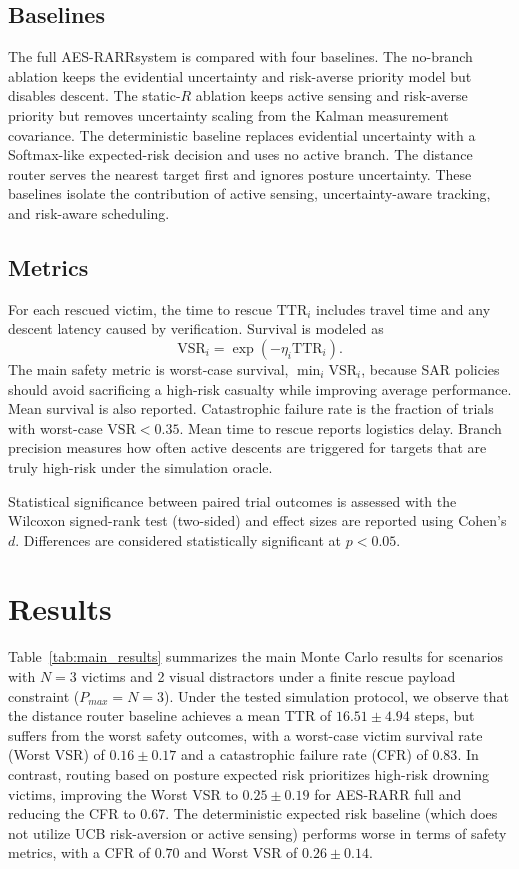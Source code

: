\documentclass[runningheads]{llncs}
\newcommand{\aes}{AES-RARR}
\newcommand{\vsr}{\mathrm{VSR}}
\newcommand{\ttr}{\mathrm{TTR}}
\begin{document}
\subsection{Baselines}

The full \aes system is compared with four baselines. The no-branch ablation keeps the evidential uncertainty and risk-averse priority model but disables descent. The static-$R$ ablation keeps active sensing and risk-averse priority but removes uncertainty scaling from the Kalman measurement covariance. The deterministic baseline replaces evidential uncertainty with a Softmax-like expected-risk decision and uses no active branch. The distance router serves the nearest target first and ignores posture uncertainty. These baselines isolate the contribution of active sensing, uncertainty-aware tracking, and risk-aware scheduling.

\subsection{Metrics}

For each rescued victim, the time to rescue $\ttr_i$ includes travel time and any descent latency caused by verification. Survival is modeled as
\begin{equation}
  \vsr_i=\exp(-\eta_i\ttr_i).
\end{equation}
The main safety metric is worst-case survival, $\min_i \vsr_i$, because SAR policies should avoid sacrificing a high-risk casualty while improving average performance. Mean survival is also reported. Catastrophic failure rate is the fraction of trials with worst-case $\vsr<0.35$. Mean time to rescue reports logistics delay. Branch precision measures how often active descents are triggered for targets that are truly high-risk under the simulation oracle.

Statistical significance between paired trial outcomes is assessed with the Wilcoxon signed-rank test (two-sided) and effect sizes are reported using Cohen's $d$. Differences are considered statistically significant at $p<0.05$.

\section{Results}

Table~\ref{tab:main_results} summarizes the main Monte Carlo results for scenarios with $N=3$ victims and 2 visual distractors under a finite rescue payload constraint ($P_{max} = N = 3$). Under the tested simulation protocol, we observe that the distance router baseline achieves a mean TTR of $16.51 \pm 4.94$ steps, but suffers from the worst safety outcomes, with a worst-case victim survival rate (Worst VSR) of $0.16 \pm 0.17$ and a catastrophic failure rate (CFR) of $0.83$. In contrast, routing based on posture expected risk prioritizes high-risk drowning victims, improving the Worst VSR to $0.25 \pm 0.19$ for \aes{} full and reducing the CFR to $0.67$. The deterministic expected risk baseline (which does not utilize UCB risk-aversion or active sensing) performs worse in terms of safety metrics, with a CFR of $0.70$ and Worst VSR of $0.26 \pm 0.14$.
\end{document}
